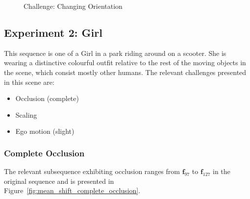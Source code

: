 \begin{figure}
{\begin{tabular}{cccc}
        \end{tabular}}
    \caption{Challenge: Changing Orientation\label{fig:mean_shift_orientation}
 }
\end{figure}

\subsection{Experiment 2: Girl}
This sequence is one of a Girl in a park riding around on a scooter. She is
wearing a distinctive colourful outfit relative to the rest of the moving objects in the
scene, which consist mostly other humans.
The relevant challenges presented in this scene are:
\begin{itemize}
    \item Occlusion (complete)
    \item Scaling 
    \item Ego motion (slight) 
\end{itemize}

\subsubsection{Complete Occlusion}
The relevant subsequence exhibiting occlusion ranges from $\mathbf{f}_{97}$ to
$\mathbf{f}_{127}$ in the original sequence and is presented in Figure~\ref{fig:mean_shift_complete_occlusion}.

